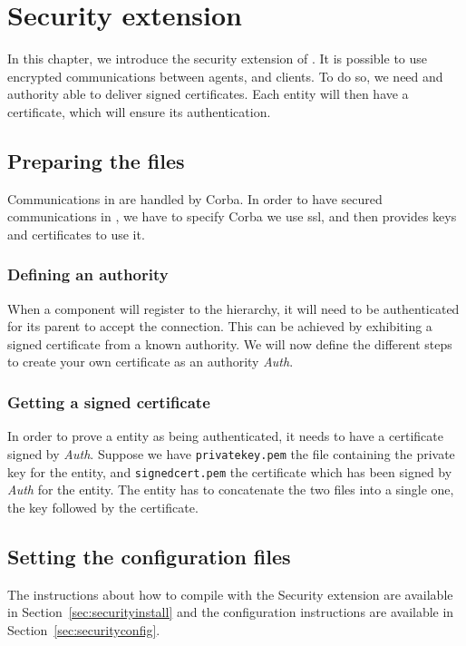 
\newcommand{\auth}{\emph{Auth}\xspace}

\chapter{Security extension}
\label{ch:Securityextension}

In this chapter, we introduce the security extension of \diet. It is 
possible to use encrypted communications between agents, \seds and 
clients. To do so, we need and authority able to deliver signed
certificates. Each entity will then have a certificate, which will
ensure its authentication.

\section{Preparing the files}

Communications in \diet are handled by Corba. In order to have
secured communications in \diet, we have to specify Corba we
use ssl, and then provides keys and certificates to use it.

\subsection{Defining an authority}

When a component will register to the \diet hierarchy, it will need
to be authenticated for its parent to accept the connection. 
This can be achieved by exhibiting a signed certificate from a known authority.
We will now define the different steps to create your own certificate as an
authority \auth.

\subsection{Getting a signed certificate}

In order to prove a \diet entity as being authenticated, it needs to have a
certificate signed by \auth.
Suppose we have \verb+privatekey.pem+ the file containing the private key for
the entity, and \verb+signedcert.pem+ the certificate which has been signed by
\auth for the entity. The entity has to concatenate the two files into a single
one, the key followed by the certificate.

\section{Setting the configuration files}

The instructions about how to compile \diet with the Security
extension are available in Section~\ref{sec:securityinstall} and the
configuration instructions are available in Section~\ref{sec:securityconfig}.



